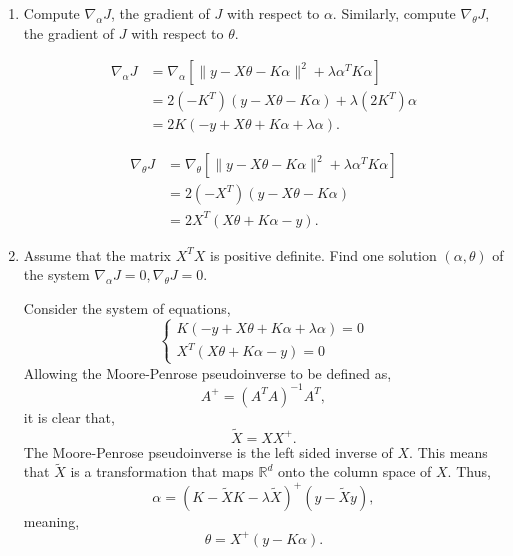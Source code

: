 \documentclass{article}[12pt]
\begin{document}
\begin{enumerate}
\item Compute $\nabla_\alpha J$, the gradient of $J$ with respect to $\alpha$. Similarly, compute $\nabla_\theta J$, the gradient of $J$ with respect to $\theta$. 


\begin{equation}
\begin{aligned}
\nabla_{\alpha} J &= \nabla_{\alpha} \left[ \|y-X \theta-K \alpha\|^{2}+\lambda \alpha^{T} K \alpha \right] \\
&= 2 \left( -K^T \right)  \left( y-X \theta-K \alpha \right) + \lambda \left( 2K^T \right) \alpha \\
&= 2K \left( -y + X \theta + K \alpha + \lambda \alpha \right).
\end{aligned}
\end{equation}

\begin{equation}
\begin{aligned}
\nabla_{\theta} J &= \nabla_{\theta} \left[ \|y-X \theta-K \alpha\|^{2}+\lambda \alpha^{T} K \alpha \right] \\
&= 2\left(-X^T \right) \left( y - X \theta - K \alpha\right) \\
&= 2X^T\left( X\theta + K\alpha -y\right).
\end{aligned}
\end{equation}

\item Assume that the matrix $X^TX$ is positive definite.
Find one solution $(\alpha,\theta)$ of the system  $\nabla_\alpha J=0, \nabla_\theta J=0$.  

Consider the system of equations,
\begin{equation}
\begin{cases}
K \left( -y + X \theta + K \alpha + \lambda \alpha \right) = 0 \\
X^T\left( X\theta + K\alpha -y\right) = 0
\end{cases}
\end{equation}
Allowing the Moore-Penrose pseudoinverse to be defined as,
\begin{equation}
A^+ = (A^T A)^{-1} A^T,
\end{equation}
it is clear that,
\begin{equation}
\tilde{X} = X X^+.
\end{equation}
The Moore-Penrose pseudoinverse is the left sided inverse of $X$. This means that $\tilde X$ is a transformation that maps $\mathbb R^d$ onto the column space of $X$. Thus,
\begin{equation}
\alpha = (K - \tilde{X} K - \lambda \tilde{X})^+ (y- \tilde{X} y),
\end{equation}
meaning,
\begin{equation}
\theta = X^+ (y - K \alpha).
\end{equation}




\end{enumerate}
\end{document}
